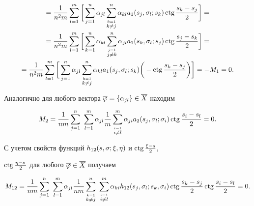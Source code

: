 \begin{pf}
\begin{multline}
%


=\frac{1}{n^2m}\suml_{l=1}^m\bigg[


\sum_{j=1}^n\alpha_{jl}\sum_{\overset{k=1}{k\ne j}}^n \alpha_{kl}


a_1(s_j,\si_l;s_k)\ctg\frac{s_k-s_j}{2}\bigg]= \\


%


=\frac{1}{n^2m}\sum_{l=1}^m\bigg[\sum_{k=1}^n\alpha_{kl}


\sum_{\overset{j=1}{j\ne k}}^n\alpha_{jl}a_1(s_k,\si_l;s_j)


\ctg\frac{s_j-s_k}{2}\bigg]= \\


%


=\frac{1}{n^2m}\sum_{l=1}^m\bigg[


\sum_{j=1}^n\alpha_{jl}\sum_{\overset{k=1}{k\ne j}}^n


\alpha_{kl}a_1(s_j,\si_l;s_k)


\bigg(-\ctg \frac{s_k-s_j}{2}\bigg)\bigg]=-M_1=0.


\end{multline}





Аналогично для любого вектора $\overline{\varphi}=\{\alpha_{jl}\}\in \overline{X}$ находим


\begin{equation}


M_2 = \frac{1}{nm}\sum_{j=1}^n\ \sum_{l=1}^m \alpha_{jl}\frac{1}{m}


\sum_{\overset{i=1}{i\ne l}}^m \alpha_{ji}a_2(s_j,\si_l;\si_i)


\ctg \frac{s_i-s_l}{2}=0.


\end{equation}


С учетом свойств функций $h_{12}(s,\sigma;\xi,\eta)$  и $\operatorname{ctg}\frac{\xi-s}{2}$, 


$\operatorname{ctg}\frac{\eta-\sigma}{2}$ для любого $\overline{\varphi}\in \overline{X}$ получаем


\begin{equation}


M_{12} = \frac{1}{nm}\sum_{j=1}^{n}\ \sum_{l=1}^m\alpha_{jl}\frac{1}{nm}


\sum_{\overset{k=1}{k\ne j}}^n\ \sum_{\overset{i=1}{i\ne l}}^m


\alpha_{ki}h_{12}(s_j,\si_l;s_k,\si_i)\ctg\frac{s_k-s_j}{2}


\ctg\frac{s_i-s_l}{2}=0.


\end{equation}






\end{pf}
